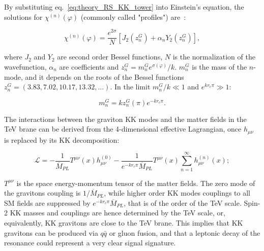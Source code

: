 \noindent By substituting eq.~\ref{eq:theory_RS_KK_tower} into Einstein's equation, the solutions for $\chi^{(n)}(\varphi)$ (commonly called "profiles") are~\cite{Davoudiasl:1999jd,Gherghetta:2000qt}:

\begin{equation}
\chi^{(n)}(\varphi) = \frac{e^{2 \sigma}}{N} \left[ J_2(z_n^G) + \alpha_n Y_2(z_n^G) \right],
\label{eq:theory_RS_KK_tower_profile}
\end{equation}

\noindent where $J_2$ and $Y_2$ are second order Bessel functions, $N$ is the normalization of the wavefunction, $\alpha_n$ are coefficients and $z_n^G = m_n^G e^{\sigma(\varphi)}/k$. $m_n^G$ is the mass of the $n$-mode, and it depends on the roots of the Bessel functions $z_n^G = \left( 3.83, 7.02, 10.17, 13.32, ... \right)$. In the limit $m_n^G/k \ll 1$ and $e^{k r_c \pi} \gg 1$:

\begin{equation}
m_n^G = k z_n^G(\pi) e^{-k r_c \pi}.
\label{eq:theory_RS_KK_tower_mass}
\end{equation}

\noindent The interactions between the graviton KK modes and the matter fields in the TeV brane can be derived from the 4-dimensional effective Lagrangian, once $h_{\mu \nu}$ is replaced by its KK decomposition:

\begin{equation}
\mathcal{L} = - \frac{1}{\overline{M}_{PL}} T^{\mu \nu}(x) h_{\mu \nu}^{(0)} - \frac{1}{e^{-k r_c \pi} \overline{M}_{PL}} T^{\mu \nu}(x) \sum_{n=1}^{\infty}h_{\mu \nu}^{(n)}(x);
\label{eq:theory_RS_KK_lagrangian}
\end{equation}

\noindent $T^{\mu \nu}$ is the space energy-momentum tensor of the matter fields. The zero mode of the gravitons coupling is $1/\overline{M}_{PL}$, while higher order KK modes couplings to all SM fields are suppressed by $e^{-k r_c \pi} \overline{M}_{PL}$, that is of the order of the TeV scale. Spin-2 KK masses and couplings are hence determined by the TeV scale, or, equivalently, KK gravitons are close to the TeV brane. This implies that KK gravitons can be produced via $q \bar{q}$ or gluon fusion, and that a leptonic decay of the resonance could represent a very clear signal signature.

